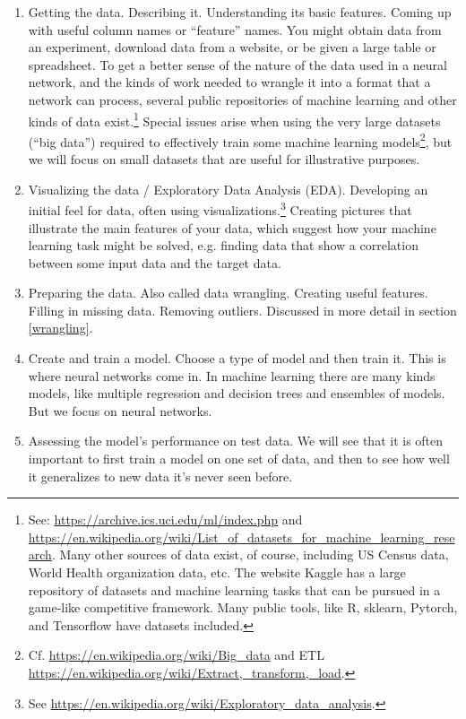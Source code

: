 \begin{enumerate}
\item Getting the data. Describing it. Understanding its basic features. Coming up with useful column names or ``feature'' names. You might obtain data from an experiment, download data from a website, or be given a large table or spreadsheet. To get a better sense of the nature of the data used in a neural network, and the kinds of work needed to wrangle it into a format that a network can process, several public repositories of machine learning and other kinds of data exist.\footnote{See: \url{https://archive.ics.uci.edu/ml/index.php} and \url{https://en.wikipedia.org/wiki/List_of_datasets_for_machine_learning_research}. Many other sources of data exist, of course, including US Census data, World Health organization data, etc. The website Kaggle has a large repository of datasets and machine learning tasks that can be pursued in a game-like competitive framework. Many public tools, like R, sklearn, Pytorch, and Tensorflow have datasets included.}  Special issues arise when using the very large datasets (``big data'') required to effectively train some machine learning models\footnote{Cf. \url{https://en.wikipedia.org/wiki/Big_data} and ETL \url{https://en.wikipedia.org/wiki/Extract,_transform,_load}.}, but we will focus on small datasets that are useful for illustrative purposes. 
\item Visualizing the data / Exploratory Data Analysis (EDA). Developing an initial feel for  data, often using visualizations.\footnote{See \url{https://en.wikipedia.org/wiki/Exploratory_data_analysis}.} Creating pictures that illustrate the main features of your data, which suggest how your machine learning task might be solved, e.g. finding data that show a correlation between some input data and the target data.
\item Preparing the data. Also called data wrangling. Creating useful features. Filling in missing data. Removing outliers. Discussed in more detail in section \ref{wrangling}.
\item Create and train a model. Choose a type of model and then train it. This is where  neural networks come in. In machine learning there are many kinds models, like multiple regression and decision trees and ensembles of models. But we focus on neural networks.
\item Assessing the model's performance on test data. We will see that it is often important to first train a model on one set of data, and then to see how well it generalizes to new data it's never seen before.
\end{enumerate}

